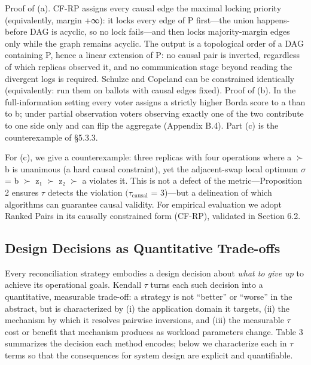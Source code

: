 \documentclass[10pt,twocolumn]{article}
\begin{document}
Proof of (a). CF-RP assigns every causal edge the maximal locking priority (equivalently, margin +∞): it locks every edge of P first—the union happens-before DAG is acyclic, so no lock fails—and then locks majority-margin edges only while the graph remains acyclic. The output is a topological order of a DAG containing P, hence a linear extension of P: no causal pair is inverted, regardless of which replicas observed it, and no communication stage beyond reading the divergent logs is required. Schulze and Copeland can be constrained identically (equivalently: run them on ballots with causal edges fixed). Proof of (b). In the full-information setting every voter assigns a strictly higher Borda score to a than to b; under partial observation voters observing exactly one of the two contribute to one side only and can flip the aggregate (Appendix B.4). Part (c) is the counterexample of §5.3.3.

For (c), we give a counterexample: three replicas with four operations where a $\succ$ b is unanimous (a hard causal constraint), yet the adjacent-swap local optimum $\sigma$ = b $\succ$ z₁ $\succ$ z₂ $\succ$ a violates it. This is not a defect of the metric—Proposition 2 ensures $\tau$ detects the violation $(\tau_{\mathrm{causal}}$ = 3)—but a delineation of which algorithms can guarantee causal validity. For empirical evaluation we adopt Ranked Pairs in its causally constrained form (CF-RP), validated in Section 6.2.

\subsection{Design Decisions as Quantitative Trade-offs}
Every reconciliation strategy embodies a design decision about \emph{what to give up} to achieve its operational goals. Kendall $\tau$ turns each such decision into a quantitative, measurable trade-off: a strategy is not “better” or “worse” in the abstract, but is characterized by (i) the application domain it targets, (ii) the mechanism by which it resolves pairwise inversions, and (iii) the measurable $\tau$ cost or benefit that mechanism produces as workload parameters change. Table 3 summarizes the decision each method encodes; below we characterize each in $\tau$ terms so that the consequences for system design are explicit and quantifiable.
\end{document}
